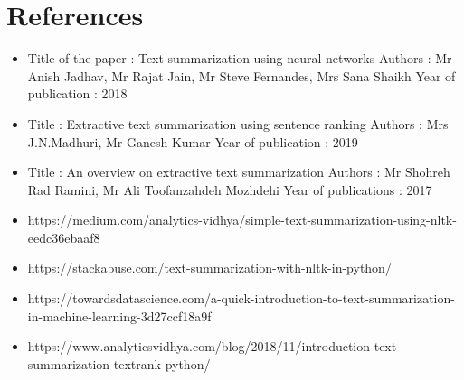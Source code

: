 \section{References}
\begin{itemize}
    \item Title of the paper : Text summarization using neural networks
Authors : Mr Anish Jadhav, Mr Rajat Jain, Mr Steve Fernandes, Mrs Sana Shaikh 
Year of publication : 2018
\item Title : Extractive text summarization using sentence ranking
Authors : Mrs J.N.Madhuri, Mr Ganesh Kumar
Year of publication : 2019
\item Title : An overview on extractive text summarization
Authors : Mr Shohreh Rad Ramini, Mr Ali Toofanzahdeh Mozhdehi
Year of publications : 2017
\item https://medium.com/analytics-vidhya/simple-text-summarization-using-nltk-eedc36ebaaf8
\item https://stackabuse.com/text-summarization-with-nltk-in-python/
\item https://towardsdatascience.com/a-quick-introduction-to-text-summarization-in-machine-learning-3d27ccf18a9f
\item https://www.analyticsvidhya.com/blog/2018/11/introduction-text-summarization-textrank-python/

\end{itemize}



